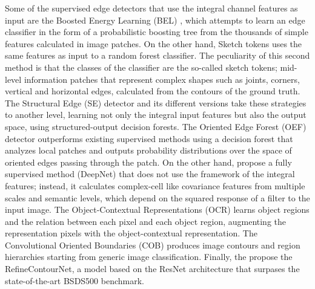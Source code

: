 \documentclass[journal]{IEEEtran}
\begin{document}
Some of the supervised edge detectors that use the integral channel features as input are the Boosted Energy Learning (BEL) \cite{Dollar.ZhuowenTu.ea:CVPR:2006}, which attempts to learn an edge classifier in the form of a probabilistic boosting tree from the thousands of simple features calculated in image patches. On the other hand, Sketch tokens \cite{Lim.Zitnick.ea:CVPR:2013} uses the same features as input to a random forest classifier. The peculiarity of this second method is that the classes of the classifier are the so-called sketch tokens; mid-level information patches that represent complex shapes such as joints, corners, vertical and horizontal edges, calculated from the contours of the ground truth. The Structural Edge (SE) detector \cite{Dollar.Zitnick:ICCV:2013} and its different versions \cite{Dollar.Zitnick:PAMI:2015} take these strategies to another level, learning not only the integral input features but also the output space, using structured-output decision forests. The Oriented Edge Forest (OEF) detector \cite{Hallman.Fowlkes:CVPR:2015} outperforms existing supervised methods using a decision forest that analyzes local patches and outputs probability distributions over the space of oriented edges passing through the patch. On the other hand, \cite{Kivinen.Williams.ea:PMLR:2014} propose a fully supervised method (DeepNet) that does not use the framework of the integral features; instead, it calculates complex-cell like covariance features from multiple scales and semantic levels, which depend on the squared response of a filter to the input image. The Object-Contextual Representations (OCR) \cite{Yuan.Chen.ea::2021} learns object regions and the relation between each pixel and each object region, augmenting the representation pixels with the object-contextual representation. The Convolutional Oriented Boundaries (COB) \cite{Maninis.Pont-Tuset.ea:ECCV:2016, Maninis.Pont-Tuset.ea:PAMI:2018} produces image contours and region hierarchies starting from generic image classification. Finally, the \cite{Kelm.Rao.ea:CAIP:2019} propose the RefineContourNet, a model based on the ResNet architecture that surpases the state-of-the-art BSDS500 benchmark. 
\end{document}
